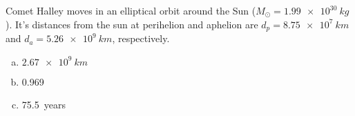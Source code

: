 \question Comet Halley moves in an elliptical orbit around the Sun ($M_\odot=\SI{1.99e30}{kg}$). It's distances from the sun at perihelion and aphelion are $d_p=\SI{8.75e7}{km}$ and $d_a=\SI{5.26e9}{km}$, respectively.
\begin{finalanswer}
\begin{enumerate}[(a)]
\item $\SI{2.67e9}{km}$
\item 0.969
\item \SI{75.5}{years}
\end{enumerate}
\end{finalanswer}

